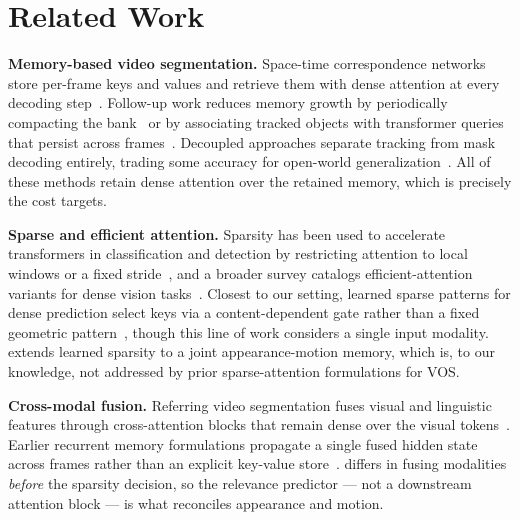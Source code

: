 \section{Related Work}
\textbf{Memory-based video segmentation.} Space-time correspondence networks store per-frame keys and values and retrieve them with dense attention at every decoding step~\cite{castillo2022stcn}. Follow-up work reduces memory growth by periodically compacting the bank~\cite{adebayo2024xmem} or by associating tracked objects with transformer queries that persist across frames~\cite{nathan2024aot}. Decoupled approaches separate tracking from mask decoding entirely, trading some accuracy for open-world generalization~\cite{reyes2023deva}. All of these methods retain dense attention over the retained memory, which is precisely the cost \methodname{} targets.

\textbf{Sparse and efficient attention.} Sparsity has been used to accelerate transformers in classification and detection by restricting attention to local windows or a fixed stride~\cite{blake2021swin}, and a broader survey catalogs efficient-attention variants for dense vision tasks~\cite{osei2021efficient}. Closest to our setting, learned sparse patterns for dense prediction select keys via a content-dependent gate rather than a fixed geometric pattern~\cite{park2023sparse}, though this line of work considers a single input modality. \methodname{} extends learned sparsity to a joint appearance-motion memory, which is, to our knowledge, not addressed by prior sparse-attention formulations for VOS.

\textbf{Cross-modal fusion.} Referring video segmentation fuses visual and linguistic features through cross-attention blocks that remain dense over the visual tokens~\cite{ferreira2022crossmodal}. Earlier recurrent memory formulations propagate a single fused hidden state across frames rather than an explicit key-value store~\cite{delacroix2020memnet}. \methodname{} differs in fusing modalities \emph{before} the sparsity decision, so the relevance predictor --- not a downstream attention block --- is what reconciles appearance and motion.
